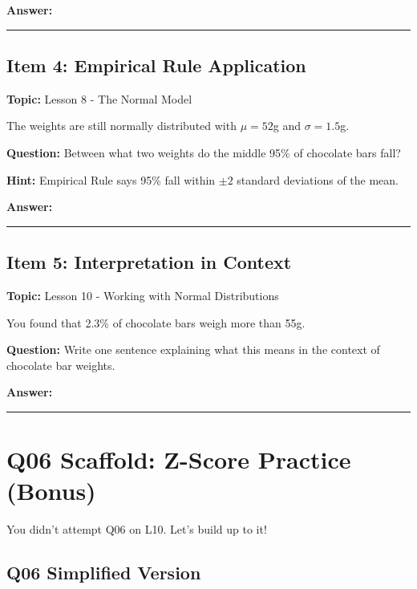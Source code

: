 \documentclass[11pt]{article}
\begin{document}
\textbf{Answer:}

\vspace{1.5in}

\hrule

\newpage

\subsection*{Item 4: Empirical Rule Application}
\textbf{Topic:} Lesson 8 - The Normal Model

The weights are still normally distributed with $\mu = 52$g and $\sigma = 1.5$g.

\textbf{Question:} Between what two weights do the middle 95\% of chocolate bars fall?

\textbf{Hint:} Empirical Rule says 95\% fall within $\pm 2$ standard deviations of the mean.

\textbf{Answer:}

\vspace{1.5in}

\hrule

\vspace{0.2in}

\subsection*{Item 5: Interpretation in Context}
\textbf{Topic:} Lesson 10 - Working with Normal Distributions

You found that 2.3\% of chocolate bars weigh more than 55g.

\textbf{Question:} Write one sentence explaining what this means in the context of chocolate bar weights.

\textbf{Answer:}

\vspace{1.5in}

\hrule

\vspace{0.2in}

\section*{Q06 Scaffold: Z-Score Practice (Bonus)}

You didn't attempt Q06 on L10. Let's build up to it!

\subsection*{Q06 Simplified Version}
\end{document}
